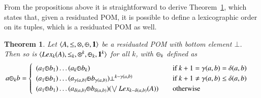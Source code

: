 \documentclass[a4paper]{elsarticle}
\newtheorem{remark}{Remark}
\newtheorem{theorem}{Theorem}
\newcommand{\monop}{\otimes}
\newcommand{\1}{\mathbf{1}}
\def\odiv{{ \ominus\hspace{-8pt}:}\;}
\begin{document}
%

From the propositions above it is straightforward to derive Theorem~\ref{prop:lexiRes}, 
which states that, given a residuated POM, it is possible to define a lexicographic 
order on its tuples, which is a residuated POM as well. 

\begin{theorem}\label{prop:lexiRes}
	Let $\langle A, \leq, \monop, \odiv, \1 \rangle$ be a residuated POM with bottom
	element $\bot$.
	Then so is $\langle Lex_k(A), \leq_k, \monop^k, \odiv_k, \1^k \rangle$ for all $k$,
	with $\odiv_k$ defined as 
	\[
	a \odiv_k b = 	\begin{cases}
	\begin{array}{lcl}
	(a_1 \odiv b_1) \ldots
	(a_k  \odiv b_k) & & \mbox{if  } k+1 = \gamma(a,b) = \delta(a,b) \\
	(a_1 \odiv b_1) \ldots  (a_{\gamma(a, b)}  \odiv b_{\gamma(a, b)}) 	
	\bot^{k - \gamma(a, b)} & & \mbox{if  } k+1 \neq \gamma(a,b) \leq \delta(a,b) \\
	(a_1 \odiv b_1) \ldots  (a_{\delta(a, b)}  \odiv b_{\delta(a, b)})
	(\bigvee Lex_{k-\delta(a,b)}(A)) & & \mbox{otherwise}
	\end{array}
	\end{cases}
	\]
\end{theorem}
\end{document}
